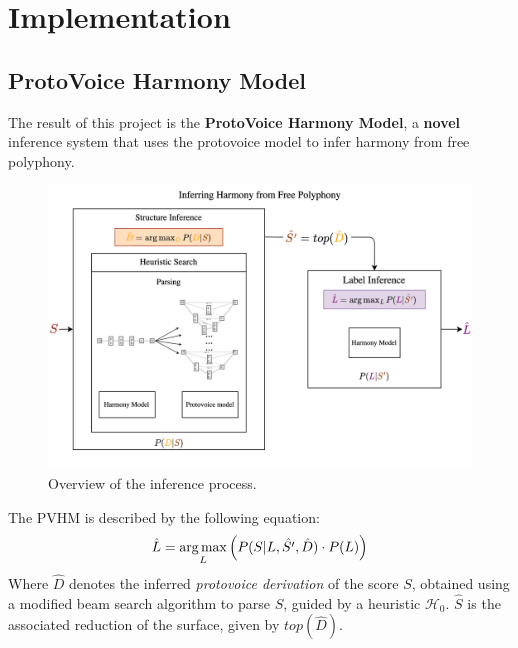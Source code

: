 \documentclass[12pt,a4paper,twoside,openright]{report} \usepackage[pdfborder={0 0 0}]{hyperref}    %
\DeclareMathOperator*{\argmax}{arg\,max} \DeclareMathOperator*{\argmin}{arg\,min}
\theoremstyle{definition} \newtheorem{definition}{Definition}[section]
\begin{document}

    \chapter{Implementation}

    \section{ProtoVoice Harmony Model}

    The result of this project is the \textbf{ProtoVoice Harmony Model}, a \textbf{novel} inference system that uses the
    protovoice model to infer harmony from free polyphony.

    \begin{figure}[h] \centering \includegraphics[width=\textwidth]{intro/inferenceOverview} \caption{Overview of the
    inference process.} \label{fig:inferenceOverview} \end{figure}

    The PVHM is described by the following equation: \begin{equation} \label{eq:pvhmSuccinct} \begin{aligned} \hat{L} &=
    \argmax_L \left( P(S|L,\hat{S'},\hat{D})\cdot P(L)\right) \\ \end{aligned} \\ \end{equation} Where $\hat{D}$ denotes
    the inferred \textit{protovoice derivation} of the score $S$, obtained using a modified beam search algorithm to
    parse $S$, guided by a heuristic $\mathcal{H_0}$.  $\hat{S}$ is the associated reduction of the surface, given by
    $top(\hat{D})$. 
\end{document}
